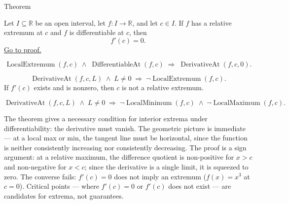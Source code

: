 
\begin{theorembox}{Theorem}
\begin{theorem}
\label{thm:interior-extremum-theorem}
Let $I \subseteq \mathbb{R}$ be an open interval, let $f : I \to \mathbb{R}$, and let $c \in I$.
If $f$ has a relative extremum at $c$ and $f$ is differentiable at $c$, then
\[
f'(c) = 0.
\]
\hyperref[prf:interior-extremum-theorem]{Go to proof.}
\end{theorem}
\end{theorembox}

\begin{remark*}
\[
\operatorname{LocalExtremum}(f, c) \;\land\; \operatorname{DifferentiableAt}(f, c)
\;\Rightarrow\; \operatorname{DerivativeAt}(f, c, 0).
\]
\end{remark*}

\begin{remark*}
\[
\operatorname{DerivativeAt}(f, c, L) \;\land\; L \neq 0
\;\Rightarrow\; \lnot\operatorname{LocalExtremum}(f, c).
\]
If $f'(c)$ exists and is nonzero, then $c$ is not a relative extremum.
\end{remark*}

\begin{remark*}
\[
\operatorname{DerivativeAt}(f, c, L) \;\land\; L \neq 0
\;\Rightarrow\;
\lnot\operatorname{LocalMinimum}(f, c) \;\land\; \lnot\operatorname{LocalMaximum}(f, c).
\]
\end{remark*}

\begin{remark*}[Interpretation]
The theorem gives a necessary condition for interior extrema under differentiability: the derivative must vanish. The geometric picture is immediate --- at a local max or min, the tangent line must be horizontal, since the function is neither consistently increasing nor consistently decreasing. The proof is a sign argument: at a relative maximum, the difference quotient is non-positive for $x > c$ and non-negative for $x < c$; since the derivative is a single limit, it is squeezed to zero. The converse fails: $f'(c) = 0$ does not imply an extremum ($f(x) = x^3$ at $c = 0$). Critical points --- where $f'(c) = 0$ or $f'(c)$ does not exist --- are candidates for extrema, not guarantees.
\end{remark*}

